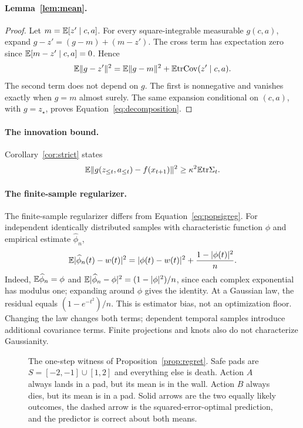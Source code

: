\paragraph{Lemma~\ref{lem:mean}.}
\begin{proof}
Let $m=\mathbb{E}[z'\mid c,a]$.
For every square-integrable measurable $g(c,a)$, expand $g-z'=(g-m)+(m-z')$.
The cross term has expectation zero since $\mathbb{E}[m-z'\mid c,a]=0$.
Hence
\[
\mathbb{E}\|g-z'\|^2=\mathbb{E}\|g-m\|^2+\mathbb{E}\mathrm{tr}\mathrm{Cov}(z'\mid c,a).
\]
The second term does not depend on $g$.
The first is nonnegative and vanishes exactly when $g=m$ almost surely.
The same expansion conditional on $(c,a)$, with $g=z_\star$, proves Equation~\ref{eq:decomposition}.
\end{proof}

\paragraph{The innovation bound.} Corollary~\ref{cor:strict} states
\begin{equation}
\label{eq:innovation}
\mathbb{E}\|g(z_{\le t},a_{\le t})-f(x_{t+1})\|^2
\ge \kappa^2\mathbb{E}\mathrm{tr}\Sigma_t .
\end{equation}

\paragraph{The finite-sample regularizer.}
The finite-sample regularizer differs from Equation~\ref{eq:popsigreg}.
For independent identically distributed samples with characteristic function $\phi$ and empirical estimate $\widehat\phi_n$,
\begin{equation}
\mathbb{E}|\widehat\phi_n(t)-w(t)|^2
=|\phi(t)-w(t)|^2+\frac{1-|\phi(t)|^2}{n}.
\end{equation}
Indeed, $\mathbb{E}\widehat\phi_n=\phi$ and $\mathbb{E}|\widehat\phi_n-\phi|^2=(1-|\phi|^2)/n$, since each complex exponential has modulus one; expanding around $\phi$ gives the identity.
At a Gaussian law, the residual equals $(1-e^{-t^2})/n$.
This is estimator bias, not an optimization floor.
Changing the law changes both terms; dependent temporal samples introduce additional covariance terms.
Finite projections and knots also do not characterize Gaussianity.


\begin{figure}[ht]
\centering
{}
\caption{The one-step witness of Proposition~\ref{prop:regret}. Safe pads are
$S = [-2,-1]\cup[1,2]$ and everything else is death. Action $A$ always lands in a pad, but its mean is in the wall.
Action $B$ always dies, but its mean is in a pad. Solid arrows are the two equally likely outcomes, the dashed arrow is the squared-error-optimal
prediction, and the predictor is correct about both means.}
\label{fig:theory}
\end{figure}

